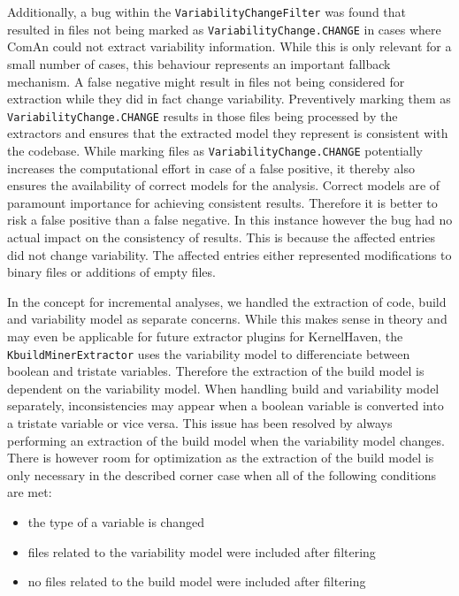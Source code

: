 \documentclass[a4paper]{article}
\begin{document}
Additionally, a bug within the \texttt{VariabilityChangeFilter} was found that resulted in files not being marked as \texttt{VariabilityChange.CHANGE} in cases where ComAn could not extract variability information. While this is only relevant for a small number of cases, this behaviour represents an important fallback mechanism. A false negative might result in files not being considered for extraction while they did in fact change variability. Preventively marking them as \texttt{VariabilityChange.CHANGE} results in those files being processed by the extractors and ensures that the extracted model they represent is consistent with the codebase. While marking files as \texttt{VariabilityChange.CHANGE} potentially increases the computational effort in case of a false positive, it thereby also ensures the availability of correct models for the analysis. Correct models are of paramount importance for achieving consistent results. Therefore it is better to risk a false positive than a false negative. In this instance however the bug had no actual impact on the consistency of results. This is because the affected entries did not change variability. The affected entries either represented modifications to binary files or additions of empty files.

In the concept for incremental analyses, we handled the extraction of code, build and variability model as separate concerns. While this makes sense in theory and may even be applicable for future extractor plugins for KernelHaven, the \texttt{KbuildMinerExtractor} uses the variability model to differenciate between boolean and tristate variables. Therefore the extraction of the build model is dependent on the variability model. When handling build and variability model separately, inconsistencies may appear when a boolean variable is converted into a tristate variable or vice versa. This issue has been resolved by always performing an extraction of the build model when the variability model changes. There is however room for optimization as the extraction of the build model is only necessary in the described corner case when all of the following conditions are met:

\begin{itemize}
	\item the type of a variable is changed
	\item files related to the variability model were included after filtering
	\item no files related to the build model were included after filtering 
\end{itemize}   
\end{document}
